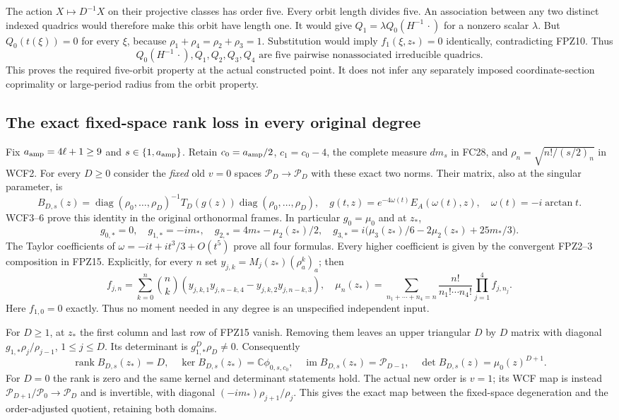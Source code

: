 \documentclass[11pt]{article}
\begin{document}
The action $X\mapsto D^{-1}X$ on their projective classes has order
five. Every orbit length divides five. An association between any two
distinct indexed quadrics would therefore make this orbit have length
one. It would give $Q_1=\lambda Q_0(H^{-1}\,\cdot)$ for a nonzero
scalar $\lambda$. But $Q_0(t(\xi))=0$ for every $\xi$, because
$\rho_1+\rho_4=\rho_2+\rho_3=1$. Substitution would imply
$f_1(\xi,z_*)=0$ identically, contradicting FPZ10. Thus
\[
 Q_0(H^{-1}\,\cdot),Q_1,Q_2,Q_3,Q_4
 \text{ are five pairwise nonassociated irreducible quadrics.}
 \tag{FPZ14}
\]
This proves the required five-orbit property at the actual constructed
point. It does not infer any separately imposed coordinate-section
coprimality or large-period radius from the orbit property.

\subsection{The exact fixed-space rank loss in every original degree}
Fix $a_{\rm amp}=4\ell+1\ge9$ and $s\in\{1,a_{\rm amp}\}$.
Retain $c_0=a_{\rm amp}/2$, $c_1=c_0-4$, the complete measure
$dm_s$ in FC28, and $\rho_n=\sqrt{n!/(s/2)_n}$ in WCF2.
For every $D\ge0$ consider the \emph{fixed} old $v=0$ spaces
$\mathcal P_D\to\mathcal P_D$ with these exact two norms.
Their matrix, also at the singular parameter, is
\[
 B_{D,s}(z)=\operatorname{diag}(\rho_0,\ldots,\rho_D)^{-1}
 T_D(g(z))\operatorname{diag}(\rho_0,\ldots,\rho_D),\quad
 g(t,z)=e^{-4\omega(t)}E_A(\omega(t),z),\quad
 \omega(t)=-i\arctan t.
 \tag{FPZ15}
\]
WCF3--6 prove this identity in the original orthonormal frames.
In particular $g_0=\mu_0$ and at $z_*$,
\[
 g_{0,*}=0,\quad g_{1,*}=-im_*,\quad
 g_{2,*}=4m_*-\mu_2(z_*)/2,\quad
 g_{3,*}=i\bigl(\mu_3(z_*)/6-2\mu_2(z_*)+25m_*/3\bigr).
 \tag{FPZ16}
\]
The Taylor coefficients of $\omega=-it+it^3/3+O(t^5)$ prove all
four formulas. Every higher coefficient is given by the convergent
FPZ2--3 composition in FPZ15. Explicitly, for every $n$ set
$y_{j,k}=M_j(z_*)(\rho_a^k)_a$; then
\[
 f_{j,n}=\sum_{k=0}^n\binom nk
 (y_{j,k,1}y_{j,n-k,4}-y_{j,k,2}y_{j,n-k,3}),\quad
 \mu_n(z_*)=\sum_{n_1+\cdots+n_4=n}
 \frac{n!}{n_1!\cdots n_4!}\prod_{j=1}^4 f_{j,n_j}.
 \tag{FPZ17}
\]
Here $f_{1,0}=0$ exactly. Thus no moment needed in any degree is
an unspecified independent input.

For $D\ge1$, at $z_*$ the first column and last row of FPZ15
vanish. Removing them leaves an upper triangular $D$ by $D$ matrix
with diagonal $g_{1,*}\rho_j/\rho_{j-1}$, $1\le j\le D$.
Its determinant is $g_{1,*}^D\rho_D\ne0$. Consequently
\[
 \operatorname{rank}B_{D,s}(z_*)=D,\quad
 \ker B_{D,s}(z_*)=\mathbb C\phi_{0,s,c_0},\quad
 \operatorname{im}B_{D,s}(z_*)=\mathcal P_{D-1},\quad
 \det B_{D,s}(z)=\mu_0(z)^{D+1}.
 \tag{FPZ18}
\]
For $D=0$ the rank is zero and the same kernel and determinant
statements hold. The actual new order is $v=1$; its WCF map is instead
$\mathcal P_{D+1}/\mathcal P_0\to\mathcal P_D$ and is invertible,
with diagonal $(-im_*)\rho_{j+1}/\rho_j$. This gives the exact
map between the fixed-space degeneration and the order-adjusted
quotient, retaining both domains.
\end{document}
